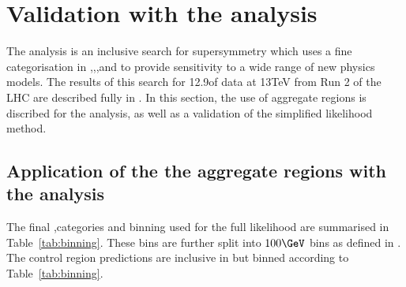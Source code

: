 \section{Validation with the \alphat analysis}
The \alphat analysis is an inclusive search for supersymmetry which
uses a fine categorisation in \nj,\nb,\scalht,and \mht to provide
sensitivity to a wide range of new physics models. The results 
of this search for 12.9\fb of data at 13TeV from Run 2 of the LHC
are described fully in \cite{CMS-PAS-SUS-16-016}. In this section,
the use of aggregate regions is discribed for the \alphat analysis, as well as a 
validation of the simplified likelihood method.

\subsection{Application of the the aggregate regions with the \alphat analysis}

The final \nj,\nb categories and \scalht binning used for the full likelihood 
are summarised in Table~\ref{tab:binning}. These bins are further split into
$100 \GeV$ \mht bins as defined in \cite{alphaT}. The control region
predictions are inclusive in \mht but binned according to Table~\ref{tab:binning}.

